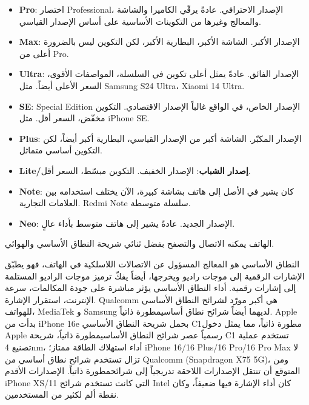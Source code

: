 \begin{itemize}
  \item \textbf{Pro}: اختصار Professional، الإصدار الاحترافي. عادةً يرقّي الكاميرا والشاشة والمعالج وغيرها من التكوينات الأساسية على أساس الإصدار القياسي.
  \item \textbf{Max}: الإصدار الأكبر. الشاشة الأكبر، البطارية الأكبر، لكن التكوين ليس بالضرورة أعلى من Pro.
  \item \textbf{Ultra}: الإصدار الفائق. عادةً يمثل أعلى تكوين في السلسلة، المواصفات الأقوى، السعر الأعلى أيضاً. مثل Samsung S24 Ultra، Xiaomi 14 Ultra.
  \item \textbf{SE}: Special Edition الإصدار الخاص، في الواقع غالباً الإصدار الاقتصادي. التكوين مخفّض، السعر أقل. مثل iPhone SE.
  \item \textbf{Plus}: الإصدار المكبّر. الشاشة أكبر من الإصدار القياسي، البطارية أكبر أيضاً، لكن التكوين أساسي متماثل.
  \item \textbf{Lite/إصدار الشباب}: الإصدار الخفيف. التكوين مبسّط، السعر أقل.
  \item \textbf{Note}: كان يشير في الأصل إلى هاتف بشاشة كبيرة، الآن يختلف استخدامه بين العلامات التجارية. Redmi Note سلسلة متوسطة.
  \item \textbf{Neo}: الإصدار الجديد. عادةً يشير إلى هاتف متوسط بأداء عالٍ.
\end{itemize}


الهاتف يمكنه الاتصال والتصفح بفضل ثنائي شريحة النطاق الأساسي والهوائي.


النطاق الأساسي هو المعالج المسؤول عن الاتصالات اللاسلكية في الهاتف، فهو يطبّق الإشارات الرقمية إلى موجات راديو ويخرجها، أيضاً يفكّ ترميز موجات الراديو المستلمة إلى إشارات رقمية. أداء النطاق الأساسي يؤثر مباشرة على جودة المكالمات، سرعة الإنترنت، استقرار الإشارة. Qualcomm هي أكبر مورّد لشرائح النطاق الأساسي للهواتف، MediaTek و Samsung لديهما أيضاً شرائح نطاق أساسيمطورة ذاتياً. Apple بدأت من iPhone 16e بحمل شريحة النطاق الأساسي C1مطورة ذاتياً، مما يمثل دخول Apple رسمياً عصر شرائح النطاق الأساسيمطورة ذاتياً، شريحة C1 تستخدم عملية تصنيع 4nm، أداء استهلاك الطاقة ممتاز؛ iPhone 16/16 Plus/16 Pro/16 Pro Max لا تزال تستخدم شرائح نطاق أساسي من Qualcomm (Snapdragon X75 5G)، ومن المتوقع أن تنتقل الإصدارات اللاحقة تدريجياً إلى شرائحمطورة ذاتياً. الإصدارات الأقدم iPhone XS/11 التي كانت تستخدم شرائح Intel كان أداء الإشارة فيها ضعيفاً، وكان نقطة ألم لكثير من المستخدمين.

